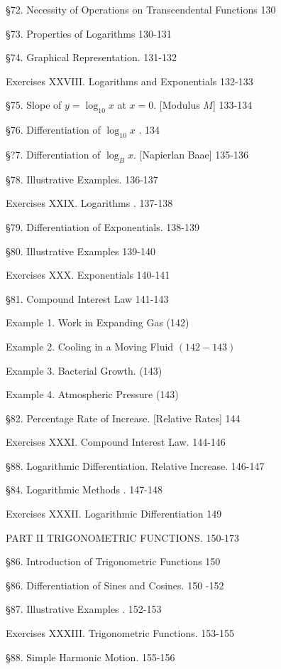 \documentclass[12pt]{article}
\begin{document}
\S 72. Necessity of Operations on Transcendental Functions 130

\S 73. Properties of Logarithms 130-131

\S 74. Graphical Representation. 131-132

Exercises XXVIII. Logarithms and Exponentials 132-133

\S 75. Slope of $y=\log_{10}x$ at $x=0$. [Modulus $M$] 133-134

\S 76. Differentiation of $\log_{10}x$ . 134

\S ?7. Differentiation of $\log_{B}x$. [Napierlan Baae] 135-136

\S 78. Illustrative Examples. 136-137

Exercises XXIX. Logarithms . 137-138

\S 79. Differentiation of Exponentials. 138-139

\S 80. Illustrative Examples 139-140

Exercises XXX. Exponentials 140-141

\S 81. Compound Interest Law 141-143
\begin{center}
Example 1. Work in Expanding Gas (142)

Example 2. Cooling in a Moving Fluid $(142-143)$

Example 3. Bacterial Growth. (143)

Example 4. Atmospheric Pressure (143)
\end{center}

\S 82. Percentage Rate of Increase. [Relative Rates] 144

Exercises XXXI. Compound Interest Law. 144-146

\S 88. Logarithmic Differentiation. Relative Increase. 146-147

\S 84. Logarithmic Methods .  147-148

Exercises XXXII. Logarithmic Differentiation 149

\begin{center}
PART II TRIGONOMETRIC FUNCTIONS. 150-173
\end{center}

\S 86. Introduction of Trigonometric Functions 150

\S 86. Differentiation of Sines and Cosines. 150 -152


\S 87. Illustrative Examples .  152-153

Exercises XXXIII. Trigonometric Functions. 153-155

\S 88. Simple Harmonic Motion. 155-156
\end{document}
